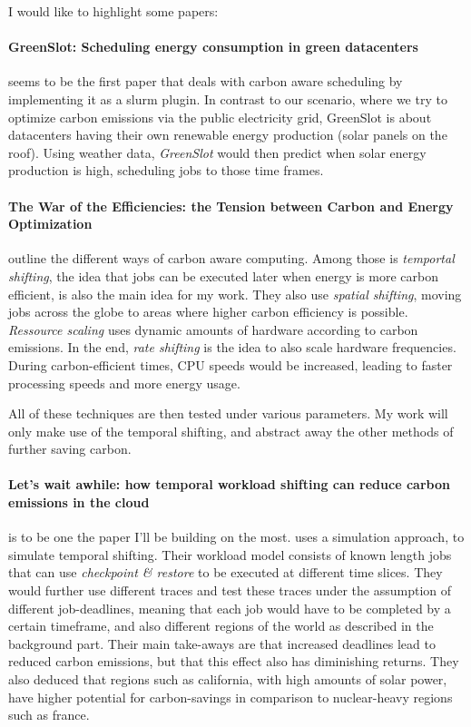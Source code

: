 I would like to highlight some papers:

\paragraph{GreenSlot: Scheduling energy consumption in green datacenters\cite{inigo_goiri_greenslot_2011}} seems to be the first paper that deals with carbon aware scheduling by implementing it as a slurm plugin.
In contrast to our scenario, where we try to optimize carbon emissions via the public electricity grid, GreenSlot is about datacenters having their own renewable energy production (solar panels on the roof). Using weather data, \emph{GreenSlot} would then predict when solar energy production is high, scheduling jobs to those time frames.  

\paragraph{The War of the Efficiencies: the Tension between Carbon and Energy Optimization} \cite{hanafy_war_2023} outline the different ways of carbon aware computing. 
Among those is \emph{temportal shifting}, the idea that jobs can be executed later when energy is more carbon efficient, is also the main idea for my work. 
They also use \emph{spatial shifting}, moving jobs across the globe to areas where higher carbon efficiency is possible. 
\emph{Ressource scaling} uses dynamic amounts of hardware according to carbon emissions.
In the end, \emph{rate shifting} is the idea to also scale hardware frequencies. During carbon-efficient times, CPU speeds would be increased, leading to faster processing speeds and more energy usage.

All of these techniques are then tested under various parameters. My work will only make use of the temporal shifting, and abstract away the other methods of further saving carbon.

\paragraph{Let's wait awhile: how temporal workload shifting can reduce carbon emissions in the cloud} is to be one the paper I'll be building on the most. 
\cite{wiesner_lets_2021} uses a simulation approach, to simulate temporal shifting. Their workload model consists of known length jobs that can use \emph{checkpoint \& restore} to be executed at different time slices. 
They would further use different traces and test these traces under the assumption of different job-deadlines, meaning that each job would have to be completed by a certain timeframe, and also different regions of the world as described in the background part. 
Their main take-aways are that increased deadlines lead to reduced carbon emissions, but that this effect also has diminishing returns. 
They also deduced that regions such as california, with high amounts of solar power, have higher potential for carbon-savings in comparison to nuclear-heavy regions such as france.
